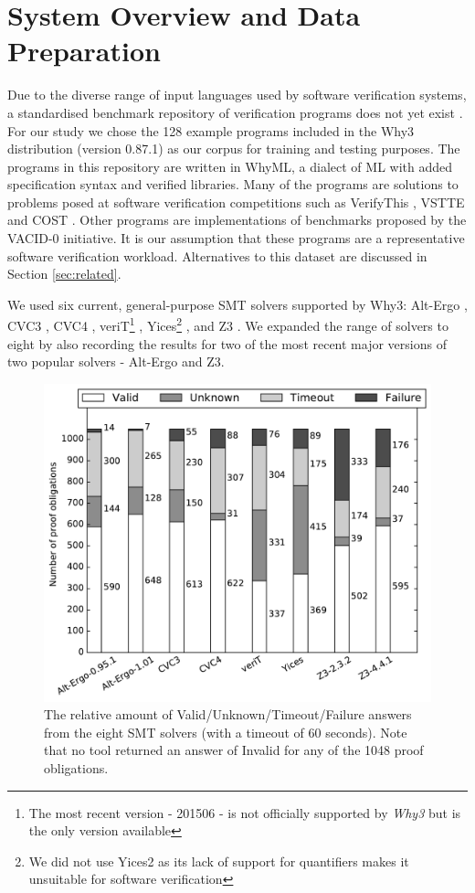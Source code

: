 \documentclass[runningheads,a4paper]{llncs}
\begin{document}
\section{System Overview and Data Preparation}
\label{sec:overview}

Due to the diverse range of input languages used by software verification systems, a standardised benchmark repository of verification programs does not yet exist \cite{Dagstuhl}.
For our study we chose the 128 example programs included in the \textsf{Why3} distribution (version 0.87.1) as our corpus for training and testing purposes. The programs in this repository are written in WhyML, a dialect of ML with added specification syntax and verified libraries. Many of the programs are solutions to problems posed at software verification competitions such as VerifyThis \cite{verifythis}, VSTTE \cite{Klebanov2011} and COST \cite{bormer:hal-00789525}. Other programs are implementations of benchmarks proposed by the VACID-0 \cite{Leino10vacid-0:verification} initiative.   It is our assumption that these programs are a representative software verification workload. Alternatives to this dataset are discussed in Section \ref{sec:related}. 
    
We used six current, general-purpose SMT solvers supported by \textsf{Why3}: Alt-Ergo \cite{AltErgo}, CVC3 \cite{CVC3}, CVC4 \cite{CVC4}, veriT\footnote{The most recent version - 201506 - is not officially supported by \textit{\textsf{Why3}} but is the only version available} \cite{veriT}, Yices\footnote{We did not use Yices2 as its lack of support for quantifiers makes it unsuitable for software verification} \cite{Yices}, and Z3 \cite{Z3}. We expanded the range of solvers to eight by also recording the results for two of the most recent major versions of two popular solvers - Alt-Ergo and Z3.


\begin{figure}
\centering
\includegraphics[width=0.7\linewidth]{barcharts}
\caption{The relative amount of Valid/Unknown/Timeout/Failure answers from the eight SMT solvers (with a timeout of 60 seconds). Note that no tool returned an answer of Invalid for any of the 1048 proof obligations.}
\label{fig:barcharts}
\end{figure}
    
\end{document}

